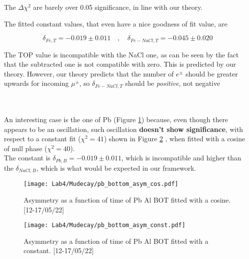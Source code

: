 \documentclass[10pt,a4paper,twocolumn]{article}
\begin{document}
The $\Delta \chi^2$ are barely over 0.05 significance, in line with our theory.

The fitted constant values, that even have a nice goodness of fit value, are  

$$\delta_{Fe,T}=-0.019 \pm 0.011 \quad , \quad \delta_{Fe-NaCl,T}=-0.045 \pm 0.020$$

The TOP value is incompatible with the NaCl one, as can be seen by the fact that the subtracted one is not compatible with zero. This is predicted by our theory. However, our theory predicts that the number of $e^\pm$ should be greater upwards for incoming $\mu^\pm$, so $\delta_{Fe-NaCl,T}$ should be \textit{positive}, not negative




\\
\\
An interesting case is the one of Pb (Figure \ref{PB_AS_COS}) because, even though there appears to be an oscillation, such oscillation \textbf{doesn't show significance}, with respect to a constant fit ($\chi^2 = 41$) shown in Figure \ref{PB_AS_CONST} , when fitted with a cosine of null phase ($\chi^2 = 40$).
\\
The constant is $\delta_{Pb,B}=-0.019 \pm 0.011 $, which is incompatible and higher than the $\delta_{NaCl,B}$, which is what would be expected in our framework.





\begin{figure}[h!]
\centering
\caption{Asymmetry as a function of time of Pb Al BOT fitted with a cosine. [12-17/05/22]}
\texttt{[image: Lab4/Mudecay/pb\_bottom\_asym\_cos.pdf]} 
\label{PB_AS_COS}
\end{figure}

\begin{figure}[h!]
\centering
\caption{Asymmetry as a function of time of Pb Al BOT fitted with a constant. [12-17/05/22]}
\texttt{[image: Lab4/Mudecay/pb\_bottom\_asym\_const.pdf]} 
\label{PB_AS_CONST}
\end{figure}
\end{document}
